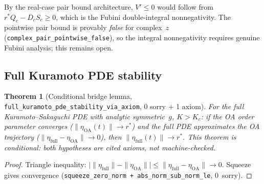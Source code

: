 \documentclass[11pt,a4paper]{article}
\newtheorem{theorem}{Theorem}[section]
\theoremstyle{definition}
\begin{document}
By the real-case pair bound architecture, $V' \leq 0$ would follow from $r^*Q_c - D_cS_c \geq 0$, which is the Fubini double-integral nonnegativity. The pointwise pair bound is provably \emph{false} for complex~$z$ (\texttt{complex\_pair\_pointwise\_false}), so the integral nonnegativity requires genuine Fubini analysis; this remains open.

\subsection{Full Kuramoto PDE stability}

\begin{theorem}[Conditional bridge lemma, \texttt{full\_kuramoto\_pde\_stability\_via\_axiom}, 0 sorry + 1 axiom]\label{thm:full}
For the full Kuramoto--Sakaguchi PDE with analytic symmetric~$g$, $K > K_c$: if the OA order parameter converges ($\|\eta_{\mathrm{OA}}(t)\| \to r^*$) and the full PDE approximates the OA trajectory ($\|\eta_{\mathrm{full}} - \eta_{\mathrm{OA}}\| \to 0$), then $\|\eta_{\mathrm{full}}(t)\| \to r^*$. This theorem is conditional: both hypotheses are cited axioms, not machine-checked.
\end{theorem}
\begin{proof}
Triangle inequality: $\bigl|\|\eta_{\mathrm{full}}\| - \|\eta_{\mathrm{OA}}\|\bigr| \leq \|\eta_{\mathrm{full}} - \eta_{\mathrm{OA}}\| \to 0$. Squeeze gives convergence (\texttt{squeeze\_zero\_norm + abs\_norm\_sub\_norm\_le}, 0~sorry).
\end{proof}
\end{document}
